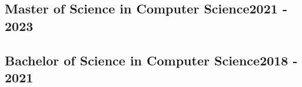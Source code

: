 \vspace*{10pt}
\subsection {{Master of Science in Computer Science}\hfill 2021 - 2023}

\vspace*{3pt}
\subsection {{Bachelor of Science in Computer Science}\hfill 2018 - 2021}
\vspace*{3pt}
